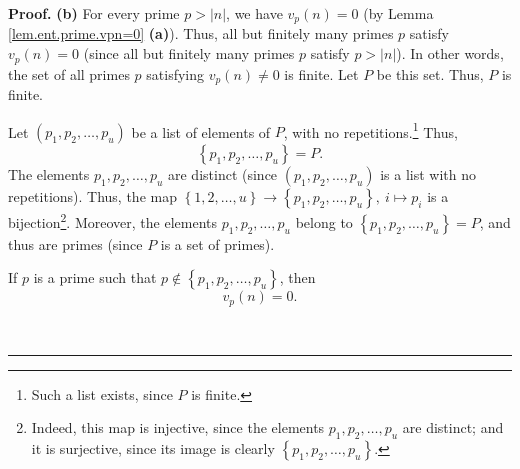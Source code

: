 \documentclass[numbers=enddot,12pt,final,onecolumn,notitlepage]{scrartcl}%
\numberwithin{exer}{subsection}
\theoremstyle{definition}
\newenvironment{fineprint}{\begin{small}}{\end{small}}
\newenvironment{proof}[1][Proof]{\noindent\textbf{#1.} }{\ \rule{0.5em}{0.5em}}
\begin{document}
\begin{proof}
\textbf{(b)} For every prime $p>\left\vert n\right\vert $, we have
$v_{p}\left(  n\right)  =0$ (by Lemma \ref{lem.ent.prime.vpn=0} \textbf{(a)}).
Thus, all but finitely many primes $p$ satisfy $v_{p}\left(  n\right)  =0$
(since all but finitely many primes $p$ satisfy $p>\left\vert n\right\vert $).
In other words, the set of all primes $p$ satisfying $v_{p}\left(  n\right)
\neq0$ is finite. Let $P$ be this set. Thus, $P$ is finite.

Let $\left(  p_{1},p_{2},\ldots,p_{u}\right)  $ be a list of elements of $P$,
with no repetitions.\footnote{Such a list exists, since $P$ is finite.} Thus,
\[
\left\{  p_{1},p_{2},\ldots,p_{u}\right\}  =P.
\]
The elements $p_{1},p_{2},\ldots,p_{u}$ are distinct (since $\left(
p_{1},p_{2},\ldots,p_{u}\right)  $ is a list with no repetitions). Thus, the
map $\left\{  1,2,\ldots,u\right\}  \rightarrow\left\{  p_{1},p_{2}%
,\ldots,p_{u}\right\}  ,\ i\mapsto p_{i}$ is a bijection\footnote{Indeed, this
map is injective, since the elements $p_{1},p_{2},\ldots,p_{u}$ are distinct;
and it is surjective, since its image is clearly $\left\{  p_{1},p_{2}%
,\ldots,p_{u}\right\}  $.}. Moreover, the elements $p_{1},p_{2},\ldots,p_{u}$
belong to $\left\{  p_{1},p_{2},\ldots,p_{u}\right\}  =P$, and thus are primes
(since $P$ is a set of primes).

If $p$ is a prime such that $p\notin\left\{  p_{1},p_{2},\ldots,p_{u}\right\}
$, then
\begin{equation}
v_{p}\left(  n\right)  =0. \label{pf.prop.ent.count-divs.vpn=0}%
\end{equation}


\begin{fineprint}
[\textit{Proof of (\ref{pf.prop.ent.count-divs.vpn=0}):} Recall that $P$ is
the set of all primes $p$ satisfying $v_{p}\left(  n\right)  \neq0$ (by the
definition of $P$). Hence, every prime $p$ satisfying $v_{p}\left(  n\right)
\neq0$ must belong to $P$. Thus, if $p$ is a prime that does not belong to
$P$, then $p$ cannot satisfy $v_{p}\left(  n\right)  \neq0$. In other words,
if $p$ is a prime that does not belong to $P$, then $p$ must satisfy
$v_{p}\left(  n\right)  =0$. In other words, if $p$ is a prime such that
$p\notin P$, then $v_{p}\left(  n\right)  =0$. Since $\left\{  p_{1}%
,p_{2},\ldots,p_{u}\right\}  =P$, this rewrites as follows: If $p$ is a prime
such that $p\notin\left\{  p_{1},p_{2},\ldots,p_{u}\right\}  $, then
$v_{p}\left(  n\right)  =0$. This proves (\ref{pf.prop.ent.count-divs.vpn=0}).]
\end{fineprint}


\end{proof}
\end{document}
